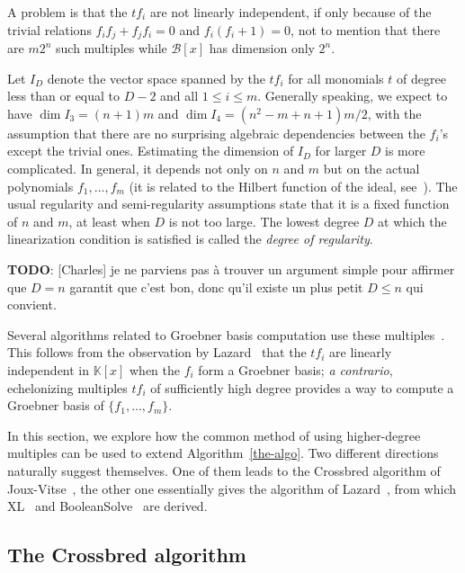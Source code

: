 \documentclass[a4paper,UKenglish,cleveref, autoref]{lipics-v2019}
\newcommand{\red}{\color{red}}
\newcommand{\TODO}[1]{{\red \textbf{TODO}:} #1\xspace}
\begin{document}
A problem is that the $t f_i$ are not linearly independent, if only because of
the trivial relations $f_i f_j + f_j f_i = 0$ and $f_i (f_i + 1) = 0$, not to
mention that there are $m 2^n$ such multiples while $\mathcal{B}[x]$ has
dimension only $2^n$.

Let $I_D$ denote the vector space spanned by the $t f_i$ for all monomials $t$
of degree less than or equal to $D-2$ and all $1 \leq i \leq m$. Generally
speaking, we expect to have $\dim I_3 = (n+1) m$ and
$\dim I_4 = (n^2 - m + n + 1)m/2 $, with the assumption that there are no
surprising algebraic dependencies between the $f_i$'s except the trivial
ones. Estimating the dimension of $I_D$ for larger $D$ is more complicated. In
general, it depends not only on $n$ and $m$ but on the actual polynomials
$f_1, \dots, f_m$ (it is related to the Hilbert function of the ideal,
see~\cite{Ideals_varieties_algos}). The usual regularity and semi-regularity
assumptions state that it is a fixed function of $n$ and $m$, at least when $D$
is not too large. The lowest degree $D$ at which the linearization condition is
satisfied is called the \textit{degree of regularity}.

\TODO{[Charles] je ne parviens pas à trouver un argument simple pour affirmer que
  $D=n$ garantit que c'est bon, donc qu'il existe un plus petit $D \leq n$ qui
  convient.}


Several algorithms related to Groebner basis computation use these
multiples~\cite{F4,F5,CourtoisKPS00,BardetFSS13,JouxV17}. This follows from the
observation by Lazard~\cite{Lazard83} that the $t f_i$ are linearly independent
in $\mathbb{K}[x]$ when the $f_i$ form a Groebner basis; \textit{a contrario},
echelonizing multiples $t f_i$ of sufficiently high degree provides a way to
compute a Groebner basis of $\{f_1, \dots, f_m\}$.

In this section, we explore how the common method of using higher-degree
multiples can be used to extend Algorithm~\ref{the-algo}. Two different
directions naturally suggest themselves. One of them leads to the
\textsf{Crossbred} algorithm of Joux-Vitse~\cite{JouxV17}, the other one
essentially gives the algorithm of Lazard~\cite{Lazard83}, from which
\textsf{XL}~\cite{CourtoisKPS00} and \textsf{BooleanSolve}~\cite{BardetFSS13}
are derived.


\subsection{The \textsf{Crossbred} algorithm}
\label{sec:JV}
\end{document}
